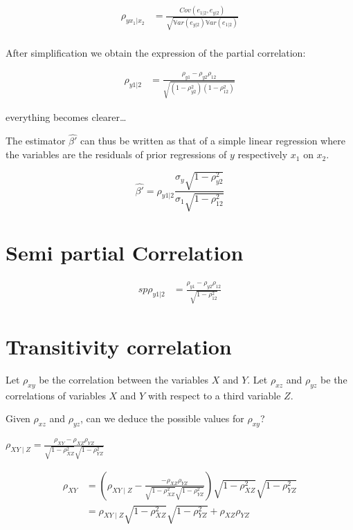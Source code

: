 \documentclass[
]{report}
\begin{document}
\begin{align*}
\rho_{yx_1|x_2}&=\frac{Cov(e_{1|2},e_{y|2})}{\sqrt{\mathbb{V}ar(e_{y|2})\mathbb{V}ar(e_{1|2})}}\\
\end{align*}

After simplification we obtain the expression of the partial correlation:

\begin{align*}
\rho_{y1|2}&=\frac{\rho_{y1}-\rho_{y2}\rho_{12}}{\sqrt{(1-\rho_{y2}^2)(1-\rho_{12}^2)}}
\end{align*}

everything becomes clearer\ldots{}

The estimator \(\hat{\beta'}\) can thus be written as that of a simple linear regression where the variables are the residuals of prior regressions of \(y\) respectively \(x_1\) on \(x_2\).

\[\hat{\beta'}=\rho_{y1|2}\frac{\sigma_y\sqrt{1-\rho_{y2}^2}}{\sigma_1\sqrt{1-\rho_{12}^2}}\]

\hypertarget{semi-partial-correlation}{%
\section{Semi partial Correlation}\label{semi-partial-correlation}}

\begin{align*}
sp\rho_{y1|2}&=\frac{\rho_{y1}-\rho_{y2}\rho_{12}}{\sqrt{1-\rho_{12}^2}}
\end{align*}

\hypertarget{transitivity-correlation}{%
\section{Transitivity correlation}\label{transitivity-correlation}}

Let \(\rho_{xy}\) be the correlation between the variables \(X\) and \(Y\). Let \(\rho_{xz}\) and \(\rho_{yz}\) be the correlations of variables \(X\) and \(Y\) with respect to a third variable \(Z\).

Given \(\rho_{xz}\) and \(\rho_{yz}\), can we deduce the possible values for \(\rho_{xy}\)?

\(\rho_{XY \mid Z}={\frac {\rho_{XY}-\rho _{XZ}\rho_{YZ}}{{\sqrt {1-\rho_{XZ}^{2}}}{\sqrt {1-\rho_{YZ}^{2}}}}}\)

\begin{align*}
  \rho_{XY} 
  &=  \left( \rho_{XY \mid Z} - \frac{ - \rho_{XZ} \rho_{YZ}}{\sqrt{1 - \rho_{XZ}^{2}} \sqrt{1 - \rho_{YZ}^{2}}} \right)  \sqrt{1 - \rho_{XZ}^{2}} \sqrt{1 - \rho_{YZ}^{2}}  \\
  &=  \rho_{XY \mid Z} \sqrt{1 - \rho_{XZ}^{2}} \sqrt{1 - \rho_{YZ}^{2}} +  \rho_{XZ} \rho_{YZ}
\end{align*}
\end{document}
